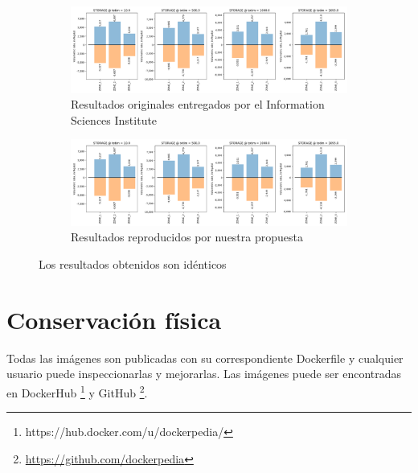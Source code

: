\begin{figure}[t]
    \centering
    \begin{subfigure}[b]{\textwidth}
         \centering
         \includegraphics[width=\textwidth]{Figures/viz-original}
         \caption[Resultados workflow originales: ModFlow]{Resultados originales entregados por el Information Sciences Institute}
         \label{fig:modflow-original}
     \end{subfigure}
	
	    \begin{subfigure}[b]{\textwidth}
         \centering
         \includegraphics[width=\textwidth]{Figures/viz-reproduced}
        \caption[Resultados workflow reproducidos: ModFlow]{Resultados reproducidos por nuestra propuesta}
         \label{fig:modflow-reproduced}
     \end{subfigure}
        \caption[Comparación resultados MODFLOW-NEW]{Los resultados obtenidos son idénticos}
        \label{fig:both-modflow}
\end{figure}






\section{Conservación física}\label{s5.2}

Todas las imágenes son publicadas con su correspondiente Dockerfile y cualquier usuario puede inspeccionarlas y mejorarlas. Las imágenes puede ser encontradas en DockerHub \footnote{https://hub.docker.com/u/dockerpedia/} y GitHub \footnote{\url{https://github.com/dockerpedia}}. 

